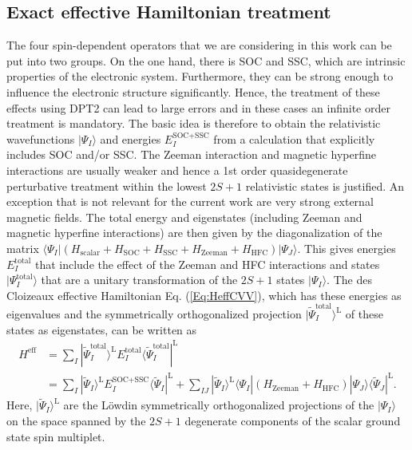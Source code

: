 \subsection{Exact effective Hamiltonian treatment}
The four spin-dependent operators that we are considering in this work can be put into two groups.
On the one hand, there is SOC and SSC, which are intrinsic properties of the electronic system. Furthermore, they can be strong enough to influence the electronic structure significantly. Hence, the treatment of these effects using DPT2 can lead to large errors and in these cases an infinite order treatment is mandatory.
The basic idea is therefore to obtain the relativistic wavefunctions $|\Psi_I\rangle$ and energies $E_I^\text{SOC+SSC}$ from a calculation that explicitly includes SOC and/or SSC. The Zeeman interaction and magnetic hyperfine interactions are usually weaker and hence a 1st order quasidegenerate perturbative treatment within the lowest $2S+1$ relativistic states is justified. An exception that is not relevant for the current work are very strong external magnetic fields. The total energy and eigenstates (including Zeeman and magnetic hyperfine interactions) are then given by the diagonalization of the matrix $\langle \Psi_I | (H_\text{scalar}+H_\text{SOC}+H_\text{SSC}+H_\text{Zeeman}+H_\text{HFC})|\Psi_J\rangle$. This gives energies $E_I^\text{total}$ that include the effect of the Zeeman and HFC interactions and states $|\Psi_I^\text{total}\rangle$ that are a unitary transformation of the $2S+1$ states $|\Psi_I\rangle$. The des Cloizeaux effective Hamiltonian Eq. (\ref{Eq:HeffCVV}), which has these energies as eigenvalues and the symmetrically orthogonalized projection $|\tilde{\Psi}_I^\text{total}\rangle^\text{L}$ of these states as eigenstates, can be written as
\begin{equation}
\begin{aligned}
H^\text{eff} &= \sum_I |\tilde{\Psi}_I^\text{total}\rangle^\text{L} E_I^\text{total} \langle \tilde{\Psi}_I^\text{total}|^\text{L}    \\
&= \sum_I |\tilde{\Psi}_I\rangle^\text{L} E_I^\text{SOC+SSC} \langle \tilde{\Psi}_I|^\text{L} +   \sum_{IJ} |\tilde{\Psi}_I\rangle^\text{L} \langle \Psi_I|(H_\text{Zeeman}+H_\text{HFC})|\Psi_J\rangle \langle \tilde{\Psi}_J |^\text{L}.
\end{aligned}
\end{equation}
Here, $|\tilde{\Psi}_I\rangle^\text{L}$ are the Löwdin symmetrically orthogonalized projections of the $|\Psi_I\rangle$ on the space spanned by the $2S+1$ degenerate components of the scalar ground state spin multiplet.
